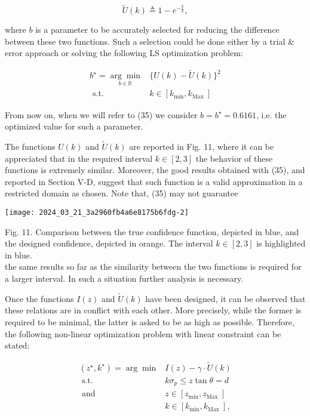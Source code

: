 \documentclass[conference]{IEEEtran}
\begin{document}
\begin{equation*}
\tilde{U}(k) \triangleq 1-e^{-\frac{k}{b}}, \tag{35}
\end{equation*}


where $b$ is a parameter to be accurately selected for reducing the difference between these two functions. Such a selection could be done either by a trial \& error approach or solving the following LS optimization problem:


\begin{align*}
b^{\star}=\underset{b \in \mathbb{R}}{\arg \min } & \{U(k)-\tilde{U}(k)\}^{2}  \tag{36}\\
\text { s.t. } & k \in\left[k_{\min }, k_{\text {Max }}\right]
\end{align*}


From now on, when we will refer to (35) we consider $b=b^{\star}=0.6161$, i.e. the optimized value for such a parameter.

The functions $U(k)$ and $\tilde{U}(k)$ are reported in Fig. 11, where it can be appreciated that in the required interval $k \in[2,3]$ the behavior of these functions is extremely similar. Moreover, the good results obtained with (35), and reported in Section V-D, suggest that such function is a valid approximation in a restricted domain as chosen. Note that, (35) may not guarantee

\begin{center}
\texttt{[image: 2024\_03\_21\_3a2960fb4a6e8175b6fdg-2]}
\end{center}

Fig. 11. Comparison between the true confidence function, depicted in blue, and the designed confidence, depicted in orange. The interval $k \in[2,3]$ is highlighted in blue.\\
the same results so far as the similarity between the two functions is required for a larger interval. In such a situation further analysis is necessary.

Once the functions $I(z)$ and $\tilde{U}(k)$ have been designed, it can be observed that these relations are in conflict with each other. More precisely, while the former is required to be minimal, the latter is asked to be as high as possible. Therefore, the following non-linear optimization problem with linear constraint can be stated:


\begin{align*}
\left(z^{\star}, k^{\star}\right)=\arg \min & I(z)-\gamma \cdot \tilde{U}(k) \\
\text { s.t. } & k \sigma_{p} \leq z \tan \theta=d  \tag{37}\\
\text { and } & z \in\left[z_{\min }, z_{\text {Max }}\right] \\
& k \in\left[k_{\min }, k_{\text {Max }}\right],
\end{align*}
\end{document}
